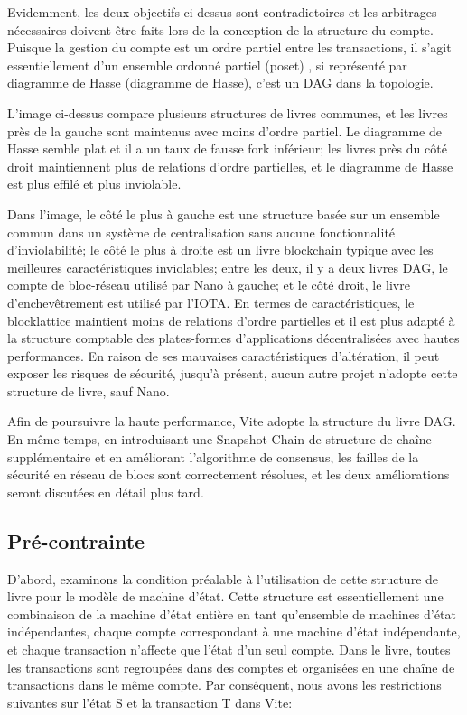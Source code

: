 \documentclass[UTF8,nofonts]{article}
\begin{document}
\begin{multicols}{2}
Evidemment, les deux objectifs ci-dessus sont contradictoires et les arbitrages nécessaires doivent être faits lors de la conception de la structure du compte. Puisque la gestion du compte est un ordre partiel entre les transactions, il s'agit essentiellement d'un ensemble ordonné partiel (poset) \cite{poset}, si représenté par diagramme de Hasse (diagramme de Hasse)\cite{hasse}, c'est un DAG dans la topologie.

L'image ci-dessus compare plusieurs structures de livres communes, et les livres près de la gauche sont maintenus avec moins d'ordre partiel. Le diagramme de Hasse semble plat et il a un taux de fausse fork inférieur; les livres près du côté droit maintiennent plus de relations d'ordre partielles, et le diagramme de Hasse est plus effilé et plus inviolable.

Dans l'image, le côté le plus à gauche est une structure basée sur un ensemble commun dans un système de centralisation sans aucune fonctionnalité d'inviolabilité; le côté le plus à droite est un livre blockchain typique avec les meilleures caractéristiques inviolables; entre les deux, il y a deux livres DAG, le compte de bloc-réseau \cite{nano} utilisé par Nano à gauche; et le côté droit, le livre d'enchevêtrement \cite{iota} est utilisé par l'IOTA. En termes de caractéristiques, le blocklattice maintient moins de relations d'ordre partielles et il est plus adapté à la structure comptable des plates-formes d'applications décentralisées avec hautes performances. En raison de ses mauvaises caractéristiques d'altération, il peut exposer les risques de sécurité, jusqu'à présent, aucun autre projet n'adopte cette structure de livre, sauf Nano.

Afin de poursuivre la haute performance, Vite adopte la structure du livre DAG. En même temps, en introduisant une Snapshot Chain de structure de chaîne supplémentaire et en améliorant l'algorithme de consensus, les failles de la sécurité en réseau de blocs sont correctement résolues, et les deux améliorations seront discutées en détail plus tard.

\subsection{Pré-contrainte}
D'abord, examinons la condition préalable à l'utilisation de cette structure de livre pour le modèle de machine d'état. Cette structure est essentiellement une combinaison de la machine d'état entière en tant qu'ensemble de machines d'état indépendantes, chaque compte correspondant à une machine d'état indépendante, et chaque transaction n'affecte que l'état d'un seul compte. Dans le livre, toutes les transactions sont regroupées dans des comptes et organisées en une chaîne de transactions dans le même compte. Par conséquent, nous avons les restrictions suivantes sur l'état S et la transaction T dans Vite:


\end{multicols}
\end{document}

